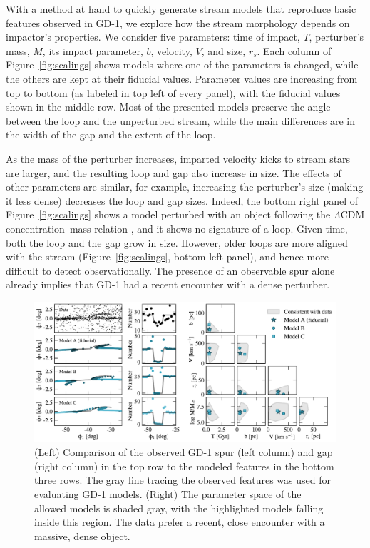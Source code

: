\documentclass[twocolumn]{aastex62}
\begin{document}
With a method at hand to quickly generate stream models that reproduce basic features observed in GD-1, we explore how the stream morphology depends on impactor's properties.
We consider five parameters: time of impact, $T$, perturber's mass, $M$, its impact parameter, $b$, velocity, $V$, and size, $r_s$.
Each column of Figure~\ref{fig:scalings} shows models where one of the parameters is changed, while the others are kept at their fiducial values.
Parameter values are increasing from top to bottom (as labeled in top left of every panel), with the fiducial values shown in the middle row.
Most of the presented models preserve the angle between the loop and the unperturbed stream, while the main differences are in the width of the gap and the extent of the loop.

As the mass of the perturber increases, imparted velocity kicks to stream stars are larger, and the resulting loop and gap also increase in size.
The effects of other parameters are similar, for example, increasing the perturber's size (making it less dense) decreases the loop and gap sizes.
Indeed, the bottom right panel of Figure~\ref{fig:scalings} shows a model perturbed with an object following the $\Lambda$CDM concentration--mass relation \citep{diemer2018}, and it shows no signature of a loop.
Given time, both the loop and the gap grow in size.
However, older loops are more aligned with the stream (Figure~\ref{fig:scalings}, bottom left panel), and hence more difficult to detect observationally.
The presence of an observable spur alone already implies that GD-1 had a recent encounter with a dense perturber.

\begin{figure}
\begin{center}
\includegraphics[width=\textwidth]{param_search.pdf}
\end{center}
\caption{(Left) Comparison of the observed GD-1 spur (left column) and gap (right column) in the top row to the modeled features in the bottom three rows. 
The gray line tracing the observed features was used for evaluating GD-1 models.
(Right) The parameter space of the allowed models is shaded gray, with the highlighted models falling inside this region.
The data prefer a recent, close encounter with a massive, dense object.
}
\label{fig:corner}
\end{figure}
\end{document}
